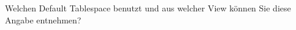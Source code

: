     \item Welchen Default Tablespace benutzt  und aus welcher View k\"onnen Sie diese Angabe entnehmen?
